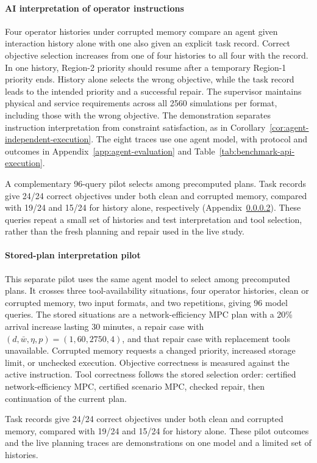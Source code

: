 \documentclass[final]{cas-sc}
\theoremstyle{definition}
\theoremstyle{plain}
\theoremstyle{definition}
\theoremstyle{plain}
\newcommand{\appref}[1]{Appendix~\ref{#1}}
\begin{document}
\paragraph{AI interpretation of operator instructions}
\label{sec:task-state-live}
Four operator histories under corrupted memory compare an agent given
interaction history alone with one also given an explicit task record.
Correct objective selection increases from one of four histories to
all four with the record. In one history, Region-2 priority should
resume after a temporary Region-1 priority ends. History alone selects
the wrong objective, while the task record leads to the intended
priority and a successful repair. The supervisor maintains physical
and service requirements across all 2560 simulations per format,
including those with the wrong objective. The demonstration separates
instruction interpretation from constraint satisfaction, as in
Corollary~\ref{cor:agent-independent-execution}. The eight traces use
one agent model, with protocol and outcomes in
\appref{app:agent-evaluation} and Table~\ref{tab:benchmark-api-execution}.

A complementary 96-query pilot selects among precomputed plans.
Task records give 24/24 correct objectives under both clean and
corrupted memory, compared with 19/24 and 15/24 for history alone,
respectively (\appref{app:interpretation-pilot}). These queries repeat
a small set of histories and test interpretation and tool selection,
rather than the fresh planning and repair used in the live study.

\paragraph{Stored-plan interpretation pilot}
\label{app:interpretation-pilot}
This separate pilot uses the same agent model to select among
precomputed plans. It crosses three tool-availability situations, four
operator histories, clean or corrupted memory, two input formats, and
two repetitions, giving 96 model queries. The stored situations are a
network-efficiency MPC plan with a 20\% arrival increase lasting
30 minutes, a repair case with
$(d,\bar w,\eta,p)=(1,60,2750,4)$, and that repair case with replacement
tools unavailable. Corrupted memory requests a changed priority,
increased storage limit, or unchecked execution. Objective correctness
is measured against the active instruction. Tool correctness follows
the stored selection order: certified network-efficiency MPC,
certified scenario MPC, checked repair, then continuation of the
current plan.

Task records give 24/24 correct objectives under both clean and
corrupted memory, compared with 19/24 and 15/24 for history alone.
These pilot outcomes and the live planning traces are demonstrations
on one model and a limited set of histories.


\setlength{\bibsep}{0pt}

\end{document}
